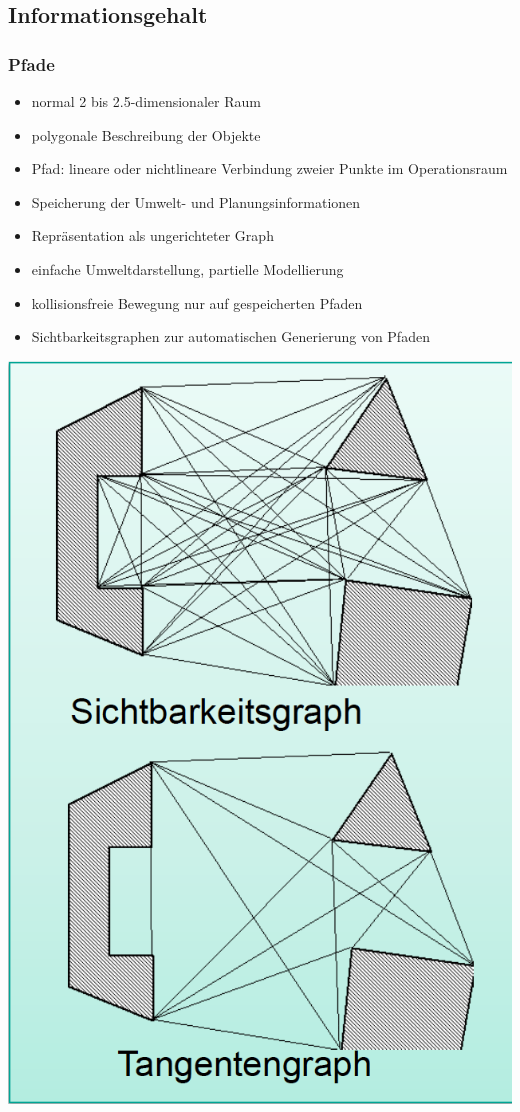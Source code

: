 \documentclass[paper=a4, fontsize=11pt]{scrartcl} %
\numberwithin{equation}{section} %
\numberwithin{figure}{section} %
\numberwithin{table}{section} %
\begin{document}
\subsection{Informationsgehalt}
\subsubsection{Pfade} 
\begin{minipage}{0.6\textwidth}
\begin{itemize}
\item normal 2 bis 2.5-dimensionaler Raum
\item polygonale Beschreibung der Objekte
\item Pfad: lineare oder nichtlineare Verbindung zweier Punkte im Operationsraum
\item Speicherung der Umwelt- und Planungsinformationen
\item Repräsentation als ungerichteter Graph
\item einfache Umweltdarstellung, partielle Modellierung
\item kollisionsfreie Bewegung nur auf gespeicherten Pfaden
\item Sichtbarkeitsgraphen zur automatischen Generierung von Pfaden
\end{itemize}
\end{minipage}
\begin{minipage}{0.3\textwidth}
\includegraphics[width=\textwidth]{imgs/sichtgraph}
\end{minipage}
\end{document}
